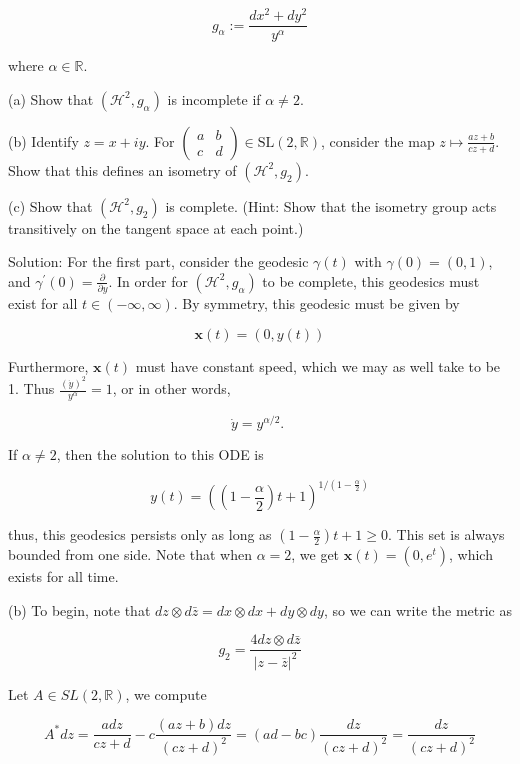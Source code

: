 \documentclass[10pt]{article}
\begin{document}
$$
g_{\alpha}:=\frac{d x^{2}+d y^{2}}{y^{\alpha}}
$$

where $\alpha \in \mathbb{R}$.

(a) Show that $\left(\mathcal{H}^{2}, g_{\alpha}\right)$ is incomplete if $\alpha \neq 2$.

(b) Identify $z=x+i y$. For $\left(\begin{array}{ll}a & b \\ c & d\end{array}\right) \in \mathrm{SL}(2, \mathbb{R})$, consider the map $z \mapsto \frac{a z+b}{c z+d}$. Show that this defines an isometry of $\left(\mathcal{H}^{2}, g_{2}\right)$.

(c) Show that $\left(\mathcal{H}^{2}, g_{2}\right)$ is complete. (Hint: Show that the isometry group acts transitively on the tangent space at each point.)

Solution: For the first part, consider the geodesic $\gamma(t)$ with $\gamma(0)=(0,1)$, and $\gamma^{\prime}(0)=\frac{\partial}{\partial y}$. In order for $\left(\mathcal{H}^{2}, g_{\alpha}\right)$ to be complete, this geodesics must exist for all $t \in(-\infty, \infty)$. By symmetry, this geodesic must be given by

$$
\mathbf{x}(t)=(0, y(t))
$$

Furthermore, $\mathbf{x}(t)$ must have constant speed, which we may as well take to be 1. Thus $\frac{(\dot{y})^{2}}{y^{\alpha}}=1$, or in other words,

$$
\dot{y}=y^{\alpha / 2} \text {. }
$$

If $\alpha \neq 2$, then the solution to this ODE is

$$
y(t)=\left(\left(1-\frac{\alpha}{2}\right) t+1\right)^{1 /\left(1-\frac{\alpha}{2}\right)}
$$

thus, this geodesics persists only as long as $\left(1-\frac{\alpha}{2}\right) t+1 \geq 0$. This set is always bounded from one side. Note that when $\alpha=2$, we get $\mathbf{x}(t)=\left(0, e^{t}\right)$, which
exists for all time.

(b) To begin, note that $d z \otimes d \bar{z}=d x \otimes d x+d y \otimes d y$, so we can write the metric as

$$
g_{2}=\frac{4 d z \otimes d \bar{z}}{|z-\bar{z}|^{2}}
$$

Let $A \in S L(2, \mathbb{R})$, we compute

$$
A^{*} d z=\frac{a d z}{c z+d}-c \frac{(a z+b) d z}{(c z+d)^{2}}=(a d-b c) \frac{d z}{(c z+d)^{2}}=\frac{d z}{(c z+d)^{2}}
$$
\end{document}

